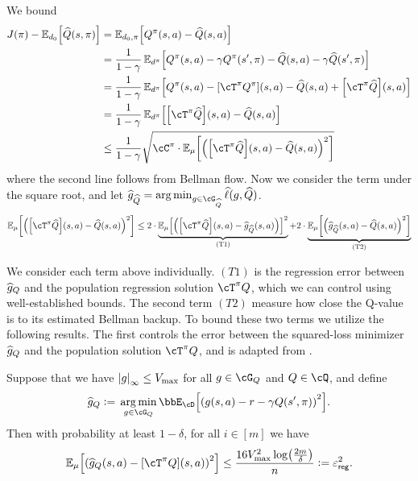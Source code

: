 %
%
%
%
%
We bound
\begin{align}
  J(\pi) - \En_{d_{0}}\sbr*{\Qhat(s,\pi)}  
  & = \En_{d_{0},\pi}\sbr*{\Qpi(s,a) - \Qhat(s,a)}
  \\
  & = \frac{1}{1-\gamma} \En_{d^\pi}\sbr*{\Qpi(s,a) - \gamma \Qpi(s',\pi) - \Qhat(s,a) - \gamma\Qhat(s',\pi)}
  \\
  & = \frac{1}{1-\gamma} \En_{d^\pi}\sbr*{\Qpi(s,a)-\sbr*{\Tpi\Qpi}(s,a)-\Qhat(s,a) + \sbr*{\Tpi\Qhat}(s,a)}
  \\
  & =  \frac{1}{1-\gamma} \En_{d^\pi}\sbr*{\sbr*{\Tpi\Qhat}(s,a) - \Qhat(s,a)}
  \\
  & \le \frac{1}{1-\gamma} \sqrt{\Cone\cdot\En_{\data}\sbr*{\rbr*{\sbr*{\Tpi\Qhat}(s,a) - \Qhat(s,a)}^2}} 
\end{align}
where the second line follows from Bellman flow. 
Now we consider the term under the square root, 
and let $\ghat = \argmin_{g\in\cG_{\Qhat}} \ellhat(g, \Qhat)$.
\begin{align}
 \En_{\data}\sbr*{\rbr*{\sbr*{\Tpi\Qhat}(s,a) - \Qhat(s,a)}^2}
 \le 2\cdot\underbrace{\En_{\data}\sbr*{\rbr*{\sbr*{\Tpi\Qhat}(s,a) - \ghat(s,a)}}^2}_{\mathrm{(T{1})}} 
 + 2\cdot\underbrace{\En_{\data}\sbr*{\rbr*{\ghat(s,a) - \Qhat(s,a)}^2}}_{\mathrm{(T{2})}} 
\end{align}

We consider each term above individually.
$(T 1)$ is the regression error between $\ghat[Q]$
and the population regression solution $\Tpi Q$, 
which we can control using well-established bounds.
The second term $(T 2)$ measure how close the Q-value is 
to its estimated Bellman backup. 
To bound these two terms we utilize the following results.
The first controls the error between the squared-loss minimizer $\ghat[Q]$ 
and the population solution $\Tpi Q$, and is adapted from \cite{xie2020batch}.
\begin{lemma}\label{lem:model-reg-concentration}
  Suppose that we have $\abr*{g}_\infty \le \Vmax$ 
  for all $g\in\cG_{Q}$ and $Q \in \cQ$,
  and define 
  \begin{align}
    \ghat[Q] \ldef{} \argmin_{g\in\cG_Q} \bbE_\cD \sbr*{\rbr*{g(s,a)-r-\gamma Q(s',\pi)}^2}.
  \end{align}
  Then with probability at least $1-\delta$, for all $i \in [m]$ we have 
  \begin{align}
    \En_\data \sbr*{\rbr*{ \ghat[Q](s,a) - \sbr*{\Tpi Q}(s,a)}^2} 
    \le \frac{16\Vmax^2\log\rbr*{\frac{2m}{\delta} }}{n}
    \ldef{} \vepssqs.
  \end{align}
\end{lemma}

